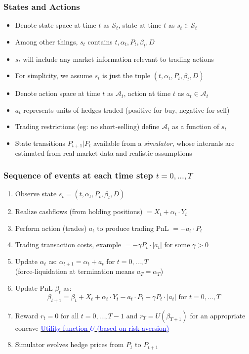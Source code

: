 \documentclass{beamer}
\begin{document}
\begin{frame}
\frametitle{States and Actions}
\begin{itemize}
\item Denote state space at time $t$ as $\mathcal{S}_t$, state at time $t$ as $s_t \in \mathcal{S}_t$
\item Among other things, $s_t$ contains $t, \alpha_t, P_t, \beta_t, D$
\item $s_t$ will include any market information relevant to trading actions
\item For simplicity, we assume $s_t$ is just the tuple $(t, \alpha_t, P_t, \beta_t, D)$
\item Denote action space at time $t$ as $\mathcal{A}_t$, action at time $t$ as $a_t \in \mathcal{A}_t$
\item $a_t$ represents units of hedges traded (positive for buy, negative for sell)
\item Trading restrictions (eg: no short-selling) define $\mathcal{A}_t$ as a function of $s_t$
\item State transitions $P_{t+1}|P_t$ available from a {\em simulator}, whose internals are estimated from real market data and realistic assumptions
\end{itemize}
\end{frame}

\begin{frame}
\frametitle{Sequence of events at each time step $t=0, \ldots, T$}
\begin{enumerate}
\item Observe state $s_t = (t, \alpha_t, P_t, \beta_t, D)$
\item Realize cashflows (from holding positions) $=X_t + \alpha_t \cdot Y_t$
\item Perform action (trades) $a_t$ to produce trading PnL $= - a_t \cdot P_t$
\item Trading transaction costs, example $= - \gamma P_t \cdot |a_t|$ for some $\gamma > 0$
\item Update $\alpha_t$ as: $\alpha_{t+1} = \alpha_t + a_t$ for $t = 0, \ldots, T$ \\(force-liquidation at termination means $a_T= \alpha_T$)
\item Update PnL $\beta_t$ as:
$$\beta_{t+1} = \beta_t + X_t + \alpha_t \cdot Y_t - a_t \cdot P_t - \gamma P_t \cdot |a_t| \mbox{ for } t = 0, \ldots, T$$
\item Reward $r_t = 0$ for all $t = 0, \ldots, T-1$ and $r_T = U(\beta_{T+1})$ for an appropriate concave \href{https://github.com/coverdrive/technical-documents/blob/master/finance/cme241/UtilityTheoryForRisk.pdf}{\underline{\textcolor{blue}{Utility function $U$ (based on risk-aversion)}}}
\item Simulator evolves hedge prices from $P_t$ to $P_{t+1}$
\end{enumerate}
\end{frame}
\end{document}
